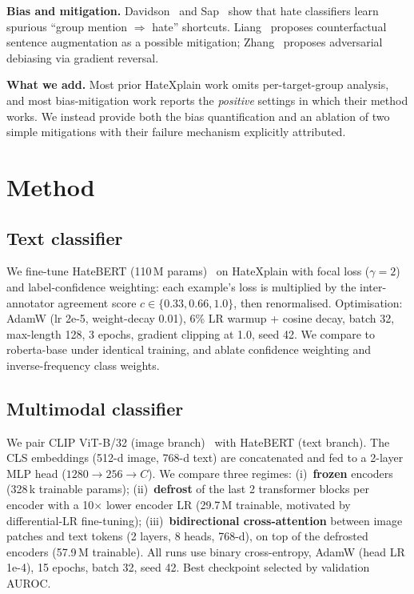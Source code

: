 \documentclass[10pt,a4paper,twocolumn]{article}
\begin{document}
\textbf{Bias and mitigation.} Davidson~\cite{davidson} and Sap~\cite{sap} show that hate classifiers learn spurious ``group mention $\Rightarrow$ hate'' shortcuts. Liang~\cite{liang} proposes counterfactual sentence augmentation as a possible mitigation; Zhang~\cite{zhang} proposes adversarial debiasing via gradient reversal.

\textbf{What we add.} Most prior HateXplain work omits per-target-group analysis, and most bias-mitigation work reports the \emph{positive} settings in which their method works. We instead provide both the bias quantification and an ablation of two simple mitigations with their failure mechanism explicitly attributed.

\section{Method}

\subsection{Text classifier}
We fine-tune HateBERT (110\,M params)~\cite{hatebert} on HateXplain with focal loss ($\gamma{=}2$)~\cite{focal} and label-confidence weighting: each example's loss is multiplied by the inter-annotator agreement score $c \in \{0.33,0.66,1.0\}$, then renormalised. Optimisation: AdamW (lr 2e-5, weight-decay 0.01), 6\% LR warmup + cosine decay, batch 32, max-length 128, 3 epochs, gradient clipping at 1.0, seed 42. We compare to roberta-base under identical training, and ablate confidence weighting and inverse-frequency class weights.

\subsection{Multimodal classifier}
We pair CLIP ViT-B/32 (image branch)~\cite{clip} with HateBERT (text branch). The CLS embeddings (512-d image, 768-d text) are concatenated and fed to a 2-layer MLP head ($1280{\to}256{\to}C$). We compare three regimes: (i)~\textbf{frozen} encoders (328\,k trainable params); (ii)~\textbf{defrost} of the last 2 transformer blocks per encoder with a 10$\times$ lower encoder LR (29.7\,M trainable, motivated by~\cite{howard-ulmfit} differential-LR fine-tuning); (iii)~\textbf{bidirectional cross-attention} between image patches and text tokens (2 layers, 8 heads, 768-d), on top of the defrosted encoders (57.9\,M trainable). All runs use binary cross-entropy, AdamW (head LR 1e-4), 15 epochs, batch 32, seed 42. Best checkpoint selected by validation AUROC.
\end{document}
